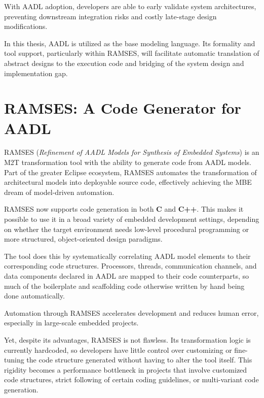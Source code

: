 \begin{tcolorbox}[colback=blue!5, colframe=blue!40!black] With AADL adoption, developers are able to early validate system architectures, preventing downstream integration risks and costly late-stage design modifications.  \end{tcolorbox}

\par
In this thesis, AADL is utilized as the base modeling language. Its formality and tool support, particularly within RAMSES, will facilitate automatic translation of abstract designs to the execution code and bridging of the system design and implementation gap.


\section{RAMSES: A Code Generator for AADL} \label{sec:ramses}

RAMSES (\textit{Refinement of AADL Models for Synthesis of Embedded Systems}) is an M2T transformation tool with the ability to generate code from AADL models. Part of the greater Eclipse ecosystem, RAMSES automates the transformation of architectural models into deployable source code, effectively achieving the \gls{MBE} dream of model-driven automation.
\par 
RAMSES now supports code generation in both \textbf{C} and \textbf{C++}. This makes it possible to use it in a broad variety of embedded development settings, depending on whether the target environment needs low-level procedural programming or more structured, object-oriented design paradigms.
\par 
The tool does this by systematically correlating AADL model elements to their corresponding code structures. Processors, threads, communication channels, and data components declared in AADL are mapped to their code counterparts, so much of the boilerplate and scaffolding code otherwise written by hand being done automatically.

\begin{tcolorbox}[colback=green!5, colframe=green!40!black] Automation through RAMSES accelerates development and reduces human error, especially in large-scale embedded projects. \end{tcolorbox}

Yet, despite its advantages, RAMSES is not flawless. Its transformation logic is currently hardcoded, so developers have little control over customizing or fine-tuning the code structure generated without having to alter the tool itself. This rigidity becomes a performance bottleneck in projects that involve customized code structures, strict following of certain coding guidelines, or multi-variant code generation.



